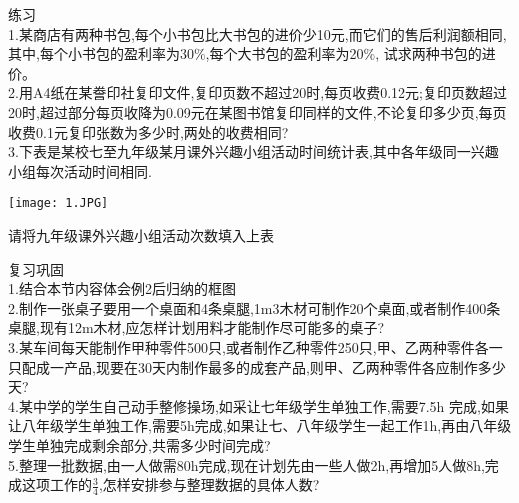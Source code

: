 \documentclass[11pt,apaper]{article}
\begin{document}
\begin{framed}
练习\\

1.某商店有两种书包,每个小书包比大书包的进价少10元,而它们的售后利润额相同,其中,每个小书包的盈利率为30$\%$,每个大书包的盈利率为20$\%$, 试求两种书包的进价。\\
2.用A4纸在某誊印社复印文件,复印页数不超过20时,每页收费0.12元;复印页数超过20时,超过部分每页收降为0.09元在某图书馆复印同样的文件,不论复印多少页,每页收费0.1元复印张数为多少时,两处的收费相同?\\
3.下表是某校七至九年级某月课外兴趣小组活动时间统计表,其中各年级同一兴趣小组每次活动时间相同.\\
\begin{center}
  \texttt{[image: 1.JPG]}\\
\end{center}


请将九年级课外兴趣小组活动次数填入上表
\end{framed}

\begin{framed}
复习巩固\\

1.结合本节内容体会例2后归纳的框图\\
2.制作一张桌子要用一个桌面和4条桌腿,1m3木材可制作20个桌面,或者制作400条桌腿,现有12m木材,应怎样计划用料才能制作尽可能多的桌子?\\
3.某车间每天能制作甲种零件500只,或者制作乙种零件250只,甲、乙两种零件各一只配成一产品,现要在30天内制作最多的成套产品,则甲、乙两种零件各应制作多少天?\\
4.某中学的学生自己动手整修操场,如采让七年级学生单独工作,需要7.5h 完成,如果让八年级学生单独工作,需要5h完成,如果让七、八年级学生一起工作1h,再由八年级学生单独完成剩余部分,共需多少时间完成?\\
5.整理一批数据,由一人做需80h完成,现在计划先由一些人做2h,再增加5人做8h,完成这项工作的$\frac{3}{4}$,怎样安排参与整理数据的具体人数?\\
\end{framed}
\end{document}
